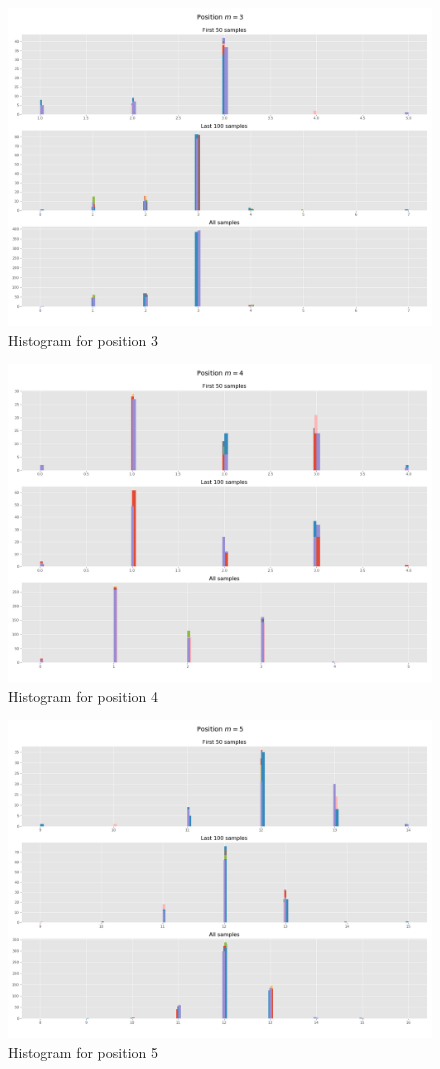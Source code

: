 \documentclass[]{article}
\begin{document}
	\begin{figure}[H]
		\begin{center}
			
			\includegraphics[width=.7\textwidth]{task4/figures/T_2_4/Q2/distribution_pos3.png}
			\caption*{Histogram for position 3}
		\end{center}
	\end{figure}
	
	\begin{figure}[H]
		\begin{center}
			
			\includegraphics[width=.7\textwidth]{task4/figures/T_2_4/Q2/distribution_pos4.png}
			\caption*{Histogram for position 4}
		\end{center}
	\end{figure}
	
	\begin{figure}[H]
		\begin{center}
			
			\includegraphics[width=.7\textwidth]{task4/figures/T_2_4/Q2/distribution_pos5.png}
			\caption*{Histogram for position 5}
		\end{center}
	\end{figure}
	
\end{document}
